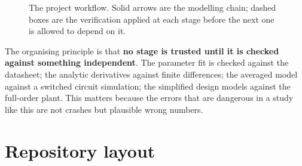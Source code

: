 \begin{figure}[htbp]
\caption[Project workflow]{The project workflow. Solid arrows are the modelling chain; dashed boxes are the verification applied at each stage before the next one is allowed to depend on it.}
\label{fig:workflow}
\end{figure}

The organising principle is that \textbf{no stage is trusted until it is checked
against something independent}. The parameter fit is checked against the
datasheet; the analytic derivatives against finite differences; the averaged
model against a switched circuit simulation; the simplified design models
against the full-order plant. This matters because the errors that are dangerous
in a study like this are not crashes but plausible wrong numbers.

\section{Repository layout}


